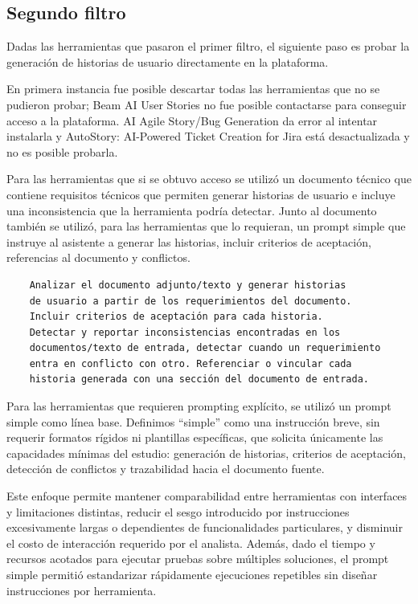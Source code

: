 \subsection{Segundo filtro}
Dadas las herramientas que pasaron el primer filtro, el siguiente paso es probar la generación de historias de usuario directamente en la plataforma.

En primera instancia fue posible descartar todas las herramientas que no se pudieron probar; Beam AI User Stories no fue posible contactarse para conseguir acceso a la plataforma. AI Agile Story/Bug Generation da error al intentar instalarla y AutoStory: AI-Powered Ticket Creation for Jira está desactualizada y no es posible probarla.

Para las herramientas que si se obtuvo acceso se utilizó un documento técnico que contiene requisitos técnicos que permiten generar historias de usuario e incluye una inconsistencia que la herramienta podría detectar. Junto al documento también se utilizó, para las herramientas que lo requieran, un prompt simple que instruye al asistente a generar las historias, incluir criterios de aceptación, referencias al documento y conflictos.

\begin{verbatim}
    Analizar el documento adjunto/texto y generar historias
    de usuario a partir de los requerimientos del documento.
    Incluir criterios de aceptación para cada historia.
    Detectar y reportar inconsistencias encontradas en los
    documentos/texto de entrada, detectar cuando un requerimiento
    entra en conflicto con otro. Referenciar o vincular cada
    historia generada con una sección del documento de entrada.
\end{verbatim}

Para las herramientas que requieren prompting explícito, se utilizó un prompt simple como línea base. Definimos “simple” como una instrucción breve, sin requerir formatos rígidos ni plantillas específicas, que solicita únicamente las capacidades mínimas del estudio: generación de historias, criterios de aceptación, detección de conflictos y trazabilidad hacia el documento fuente.

Este enfoque permite mantener comparabilidad entre herramientas con interfaces y limitaciones distintas, reducir el sesgo introducido por instrucciones excesivamente largas o dependientes de funcionalidades particulares, y disminuir el costo de interacción requerido por el analista. Además, dado el tiempo y recursos acotados para ejecutar pruebas sobre múltiples soluciones, el prompt simple permitió estandarizar rápidamente ejecuciones repetibles sin diseñar instrucciones por herramienta.

